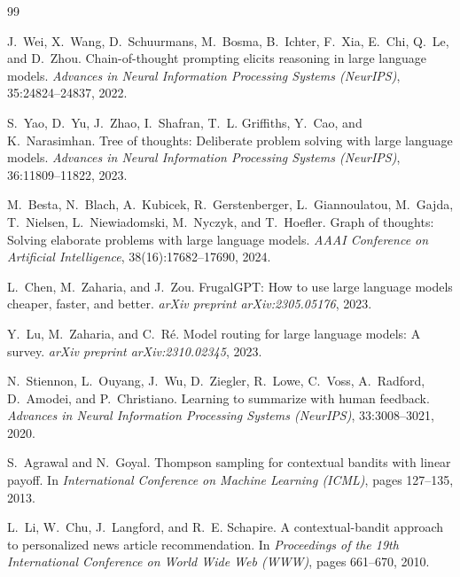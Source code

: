 \documentclass{article}
\begin{document}
\begin{thebibliography}{99}

J.~Wei, X.~Wang, D.~Schuurmans, M.~Bosma, B.~Ichter, F.~Xia, E.~Chi, Q.~Le, and D.~Zhou.
\newblock Chain-of-thought prompting elicits reasoning in large language models.
\newblock \emph{Advances in Neural Information Processing Systems (NeurIPS)}, 35:24824--24837, 2022.

S.~Yao, D.~Yu, J.~Zhao, I.~Shafran, T.~L. Griffiths, Y.~Cao, and K.~Narasimhan.
\newblock Tree of thoughts: Deliberate problem solving with large language models.
\newblock \emph{Advances in Neural Information Processing Systems (NeurIPS)}, 36:11809--11822, 2023.

M.~Besta, N.~Blach, A.~Kubicek, R.~Gerstenberger, L.~Giannoulatou, M.~Gajda, T.~Nielsen, L.~Niewiadomski, M.~Nyczyk, and T.~Hoefler.
\newblock Graph of thoughts: Solving elaborate problems with large language models.
\newblock \emph{AAAI Conference on Artificial Intelligence}, 38(16):17682--17690, 2024.

L.~Chen, M.~Zaharia, and J.~Zou.
\newblock FrugalGPT: How to use large language models cheaper, faster, and better.
\newblock \emph{arXiv preprint arXiv:2305.05176}, 2023.

Y.~Lu, M.~Zaharia, and C.~R{\'e}.
\newblock Model routing for large language models: A survey.
\newblock \emph{arXiv preprint arXiv:2310.02345}, 2023.

N.~Stiennon, L.~Ouyang, J.~Wu, D.~Ziegler, R.~Lowe, C.~Voss, A.~Radford, D.~Amodei, and P.~Christiano.
\newblock Learning to summarize with human feedback.
\newblock \emph{Advances in Neural Information Processing Systems (NeurIPS)}, 33:3008--3021, 2020.

S.~Agrawal and N.~Goyal.
\newblock Thompson sampling for contextual bandits with linear payoff.
\newblock In \emph{International Conference on Machine Learning (ICML)}, pages 127--135, 2013.

L.~Li, W.~Chu, J.~Langford, and R.~E. Schapire.
\newblock A contextual-bandit approach to personalized news article recommendation.
\newblock In \emph{Proceedings of the 19th International Conference on World Wide Web (WWW)}, pages 661--670, 2010.

\end{thebibliography}
\end{document}
